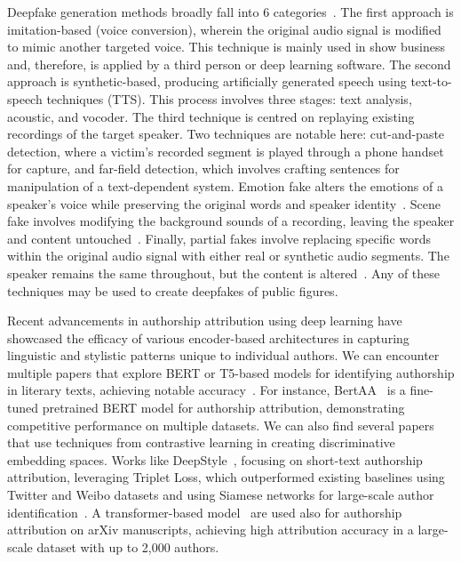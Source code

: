\documentclass{Interspeech}
\begin{document}
Deepfake generation methods broadly fall into 6
categories~\cite{review_audio_deepfake_issues}. The first approach is
imitation-based (voice conversion), wherein the original audio signal is
modified to mimic another targeted voice. This technique is mainly used in show
business and, therefore, is applied by a third person or deep learning
software. The second approach is synthetic-based, producing artificially
generated speech using text-to-speech techniques (TTS). This process involves
three stages: text analysis, acoustic, and vocoder. The third technique is
centred on replaying existing recordings of the target speaker. Two techniques
are notable here: cut-and-paste detection, where a victim's recorded segment is
played through a phone handset for capture, and far-field detection, which
involves crafting sentences for manipulation of a text-dependent system.
Emotion fake alters the emotions of a speaker's voice while preserving the
original words and speaker identity~\cite{zhao2023emofake}. Scene fake involves
modifying the background sounds of a recording, leaving the speaker and content
untouched~\cite{yi2022scenefake}. Finally, partial fakes involve replacing
specific words within the original audio signal with either real or synthetic
audio segments. The speaker remains the same throughout, but the content is
altered~\cite{yi2023halftruth}. Any of these techniques may be used to create
deepfakes of public figures.

Recent advancements in authorship attribution using deep learning have
showcased the efficacy of various encoder-based architectures in capturing
linguistic and stylistic patterns unique to individual authors. We can
encounter multiple papers that explore BERT or T5-based models for identifying
authorship in literary texts, achieving notable
accuracy~\cite{hicke2023t5,silva2024forged}. For instance,
BertAA~\cite{fabien2020bertaa} is a fine-tuned pretrained BERT model for
authorship attribution, demonstrating competitive performance on multiple
datasets. We can also find several papers that use techniques from contrastive
learning in creating discriminative embedding spaces. Works like
DeepStyle~\cite{hu2020deepstyle}, focusing on short-text authorship
attribution, leveraging Triplet Loss, which outperformed existing baselines
using Twitter and Weibo datasets and using Siamese networks for large-scale
author identification~\cite{saedi2021siamese}. A transformer-based
model~\cite{bauersfeld2023cracking} are used also for authorship attribution on
arXiv manuscripts, achieving high attribution accuracy in a large-scale dataset
with up to 2,000 authors.
\end{document}
